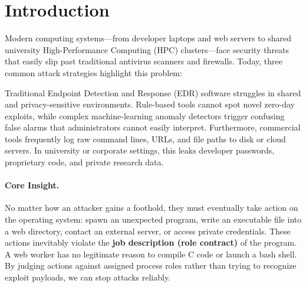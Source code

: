 \documentclass[10pt,twocolumn,letterpaper]{article}
\makeatletter
\theoremstyle{plain}
\theoremstyle{definition}
\theoremstyle{remark}
\DeclareRobustCommand{\_}{\ifmmode\nfss@text{\textunderscore}\else\textunderscore\penalty\@highpenalty\hskip\z@skip\fi}
\makeatother
\begin{document}
\section{Introduction}
\label{sec:intro}

Modern computing systems---from developer laptops and web servers to shared university High-Performance Computing (HPC) clusters---face security threats that easily slip past traditional antivirus scanners and firewalls. Today, three common attack strategies highlight this problem:

Traditional Endpoint Detection and Response (EDR) software struggles in shared and privacy-sensitive environments. Rule-based tools cannot spot novel zero-day exploits, while complex machine-learning anomaly detectors trigger confusing false alarms that administrators cannot easily interpret. Furthermore, commercial tools frequently log raw command lines, URLs, and file paths to disk or cloud servers. In university or corporate settings, this leaks developer passwords, proprietary code, and private research data.

\paragraph{Core Insight.} No matter how an attacker gains a foothold, they must eventually take action on the operating system: spawn an unexpected program, write an executable file into a web directory, contact an external server, or access private credentials. These actions inevitably violate the \textbf{job description (role contract)} of the program. A web worker has no legitimate reason to compile C code or launch a bash shell. By judging actions against assigned process roles rather than trying to recognize exploit payloads, we can stop attacks reliably.
\end{document}
